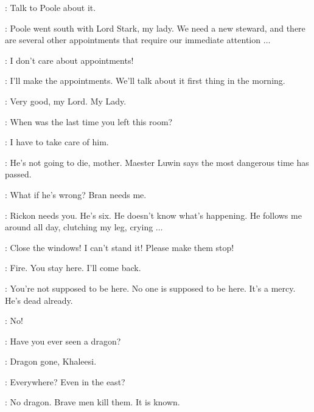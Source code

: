 \CATELYN: Talk to Poole about it. 

\LUWIN: Poole went south with Lord Stark, my lady. We need a new steward, and there are several other appointments that require our immediate attention $\ldots$ 

\CATELYN: I don't care about appointments! 


\ROBB: I'll make the appointments. We'll talk about it first thing in the morning. 

\LUWIN: Very good, my Lord. My Lady. 


\ROBB: When was the last time you left this room? 

\CATELYN: I have to take care of him. 

\ROBB: He's not going to die, mother. Maester Luwin says the most dangerous time has passed. 

\CATELYN: What if he's wrong? Bran needs me. 

\ROBB: Rickon needs you. He's six. He doesn't know what's happening. He follows me around all day, clutching my leg, crying $\ldots$ 

\CATELYN: Close the windows! I can't stand it! Please make them stop! 

\ROBB: Fire. You stay here. I'll come back. 


\MAN: You're not supposed to be here. No one is supposed to be here. It's a mercy. He's dead already. 

\CATELYN: No! 


\scene



\DAENERYS: Have you ever seen a dragon? 

\IRRI: Dragon gone, Khaleesi. 

\DAENERYS: Everywhere? Even in the east? 

\IRRI: No dragon. Brave men kill them. It is known. 


